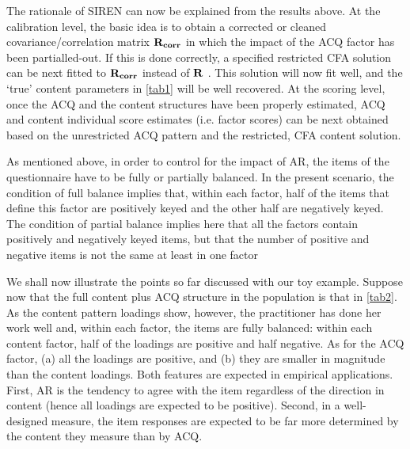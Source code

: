 The rationale of SIREN can now be explained from the results above. At the calibration level, the basic idea is to obtain a corrected or cleaned covariance/correlation matrix $\bf{R_{corr}}$ in which the impact of the ACQ factor has been partialled-out. If this is done correctly, a specified restricted CFA solution can be next fitted to $\bf{R_{corr}}$  instead of $\bf{R}$ . This solution will now fit well, and the ‘true’ content parameters in \cref{tab1} will be well recovered.
At the scoring level, once the ACQ and the content structures have been properly estimated, ACQ and content individual score estimates (i.e. factor scores) can be next obtained based on the unrestricted ACQ pattern and the restricted, CFA content solution.

As mentioned above, in order to control for the impact of AR, the items of the questionnaire have to be fully or partially balanced. In the present scenario, the condition of full balance implies that, within each factor, half of the items that define this factor are positively keyed and the other half are negatively keyed. The condition of partial balance implies here that all the factors contain positively and negatively keyed items, but that the number of positive and negative items is not the same at least in one factor \citep[e.g.][]{Lorenzo-Seva:2009}

We shall now illustrate the points so far discussed with our toy example. Suppose now that the full content plus ACQ structure in the population is that in \cref{tab2}. As the content pattern loadings show, however, the practitioner has done her work well and, within each factor, the items are fully balanced:  within each content factor, half of the loadings are positive and half negative. As for the ACQ factor, (a) all the loadings are positive, and (b) they are smaller in magnitude than the content loadings. Both features are expected in empirical applications. First, AR is the tendency to agree with the item regardless of the direction in content (hence all loadings are expected to be positive). Second, in a well-designed measure, the item responses are expected to be far more determined by the content they measure than by ACQ.


